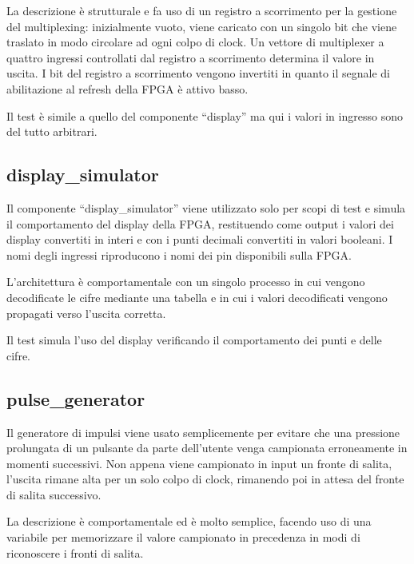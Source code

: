 \documentclass [11pt,a4paper,oneside,draft]{article}
\begin{document}


La descrizione è strutturale e fa uso di un registro a scorrimento
per la gestione del multiplexing: inizialmente vuoto, viene caricato
con un singolo bit che viene traslato in modo circolare ad ogni colpo
di clock. Un vettore di multiplexer a quattro ingressi controllati
dal registro a scorrimento determina il valore in uscita. I bit
del registro a scorrimento vengono invertiti in quanto il segnale
di abilitazione al refresh della FPGA è attivo basso.



Il test è simile a quello del componente ``display'' ma qui i valori in
ingresso sono del tutto arbitrari.

\subsection{display\_simulator}

Il componente ``display\_simulator'' viene utilizzato solo per scopi di
test e simula il comportamento del display della FPGA, restituendo come
output i valori dei display convertiti in interi e con i punti decimali
convertiti in valori booleani. I nomi degli ingressi riproducono i nomi
dei pin disponibili sulla FPGA.



L'architettura è comportamentale con un singolo processo in cui vengono
decodificate le cifre mediante una tabella e in cui i valori decodificati
vengono propagati verso l'uscita corretta.



Il test simula l'uso del display verificando il comportamento dei punti e
delle cifre.

\subsection{pulse\_generator}

Il generatore di impulsi viene usato semplicemente per evitare che una
pressione prolungata di un pulsante da parte dell'utente venga
campionata erroneamente in momenti successivi. Non appena viene
campionato in input un fronte di salita, l'uscita rimane alta per un solo
colpo di clock, rimanendo poi in attesa del fronte di salita successivo.



La descrizione è comportamentale ed è molto semplice, facendo uso di
una variabile per memorizzare il valore campionato in precedenza in
modi di riconoscere i fronti di salita.


\end{document}
